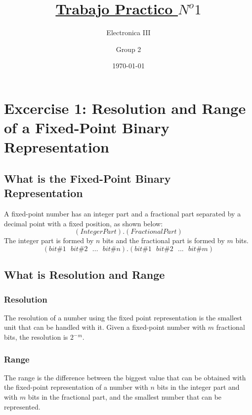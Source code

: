 \documentclass[a4paper,12pt]{report}
\begin{document}
\title{\color{magenta}\underline {Trabajo Practico $N^o 1$}}
\author{Electronica III}
\author{\color{green}Group 2}
\date{\color{blue}\today} %

\maketitle

\section{\color{olive}Excercise 1: Resolution and Range of a Fixed-Point Binary Representation}

\subsection{\color{purple}What is the Fixed-Point Binary Representation}
A fixed-point number has an integer part and a fractional part separated by a decimal point with a fixed position, as shown below:
$$ (Integer Part).(Fractional Part)$$
The integer part is formed by $n$ bits and the fractional part is formed by $m$ bits.
$$ (bit \#1\ \ \ bit \#2\ \ \ ...\ \ \ bit \#n).(bit \#1\ \ \ bit \#2\ \ \ ...\ \ \ bit \#m)$$

\subsection{\color{purple}What is Resolution and Range}
\subsubsection{\color{red}Resolution}
The resolution of a number using the fixed point representation is the smallest unit that can be handled with it.
Given a fixed-point number with $m$ fractional bits, the resolution is $2^- $$^m$. %
\subsubsection{\color{red}Range}
The range is the difference between the biggest value that can be obtained with the fixed-point representation of a number with $n$ bits in the integer part and with $m$ bits in the fractional part, and the smallest number that can be represented.
\end{document}
